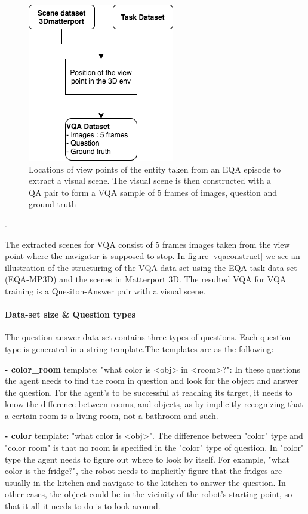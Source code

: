 \begin{figure}[H]
\centering
\includegraphics[scale=0.5]{latex/images/VQAConstruct.png}
\caption{Locations of view points of the entity taken from an EQA episode to extract a visual scene. The visual scene is then constructed with a QA pair to form a VQA sample of 5 frames of images, question and ground truth }
\label{fig:vqaconstruct}
\end{figure}.

The extracted scenes for VQA consist of 5 frames images taken from the view point where the navigator is supposed to stop. In figure \ref{vqaconstruct} we see an illustration of the structuring of the VQA data-set using the EQA task data-set (EQA-MP3D) and the scenes in Matterport 3D. The resulted VQA for VQA training is a Quesiton-Answer pair with a visual scene. 

\paragraph{Data-set size & Question types}

The question-answer data-set contains three types of questions. Each question-type is generated in a string template.The templates are as the following:

\textbf{- color\_room} template: "what color is <obj> in  <room>?": In these questions the agent needs to find the room in question and look for the object and answer the question. For the agent's to be successful at reaching its target, it needs to know the difference between rooms, and objects, as by implicitly recognizing that a certain room is a living-room, not a bathroom and such.  

\textbf{- color} template: "what color is <obj>". The difference between "color" type and "color room" is that no room is specified in the "color" type of question. In "color" type the agent needs to figure out where to look by itself. For example, "what color is the fridge?", the robot needs to implicitly figure that the fridges are usually in the kitchen and navigate to the kitchen to answer the question. In other cases, the object could be in the vicinity of the robot's starting point, so that it all it needs to do is to look around. 

